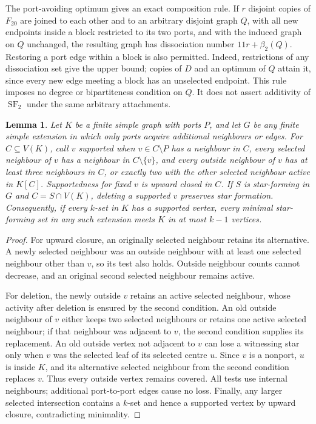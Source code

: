 \documentclass[11pt]{article}
\newtheorem{lemma}[theorem]{Lemma}
\newcommand{\SF}{\operatorname{SF}_2}
\newcommand{\diss}{\beta_2}
\begin{document}
The port-avoiding optimum gives an exact composition rule. If $r$ disjoint
copies of $F_{20}$ are joined to each other and to an arbitrary disjoint
graph $Q$, with all new endpoints inside a block restricted to its two
ports, and with the induced graph on $Q$ unchanged, the resulting graph has
dissociation number $11r+\diss(Q)$.
Restoring a port edge within a block is also permitted. Indeed, restrictions
of any dissociation set give the upper bound; copies of $D$ and an optimum
of $Q$ attain it, since every new edge meeting a block has an unselected
endpoint. This rule imposes no degree or bipartiteness condition on $Q$.
It does not assert additivity of $\SF$ under the same arbitrary attachments.

\begin{lemma}\label{lem:supported-deletion}
Let $K$ be a finite simple graph with ports $P$, and let $G$ be any finite
simple extension in which only ports acquire additional neighbours or edges.
For $C\subseteq V(K)$, call $v$ supported when $v\in C\setminus P$ has a
neighbour in $C$, every selected neighbour of $v$ has a neighbour in
$C\setminus\{v\}$, and every outside neighbour of $v$ has at least three
neighbours in $C$, or exactly two with the other selected neighbour active
in $K[C]$. Supportedness for fixed $v$ is upward closed in $C$.
If $S$ is star-forming in $G$ and $C=S\cap V(K)$, deleting a supported $v$
preserves star formation. Consequently, if every $k$-set in $K$ has a
supported vertex, every minimal star-forming set in any such extension meets
$K$ in at most $k-1$ vertices.
\end{lemma}
\begin{proof}
For upward closure, an originally selected neighbour retains its alternative.
A newly selected neighbour was an outside neighbour with at least one selected
neighbour other than $v$, so its test also holds. Outside neighbour counts
cannot decrease, and an original second selected neighbour remains active.

For deletion, the newly outside $v$ retains an active selected neighbour,
whose activity after deletion is ensured by the second condition. An old
outside neighbour of $v$ either keeps two selected neighbours or retains one
active selected neighbour; if that neighbour was adjacent to $v$, the second
condition supplies its replacement. An old outside vertex not adjacent to
$v$ can lose a witnessing star only when $v$ was the selected leaf of its
selected centre $u$. Since $v$ is a nonport, $u$ is inside $K$, and its
alternative selected neighbour from the second condition replaces $v$.
Thus every outside vertex remains covered. All tests use internal neighbours;
additional port-to-port edges cause no loss. Finally, any larger selected
intersection contains a $k$-set and hence a supported vertex by upward closure,
contradicting minimality.
\end{proof}
\end{document}
